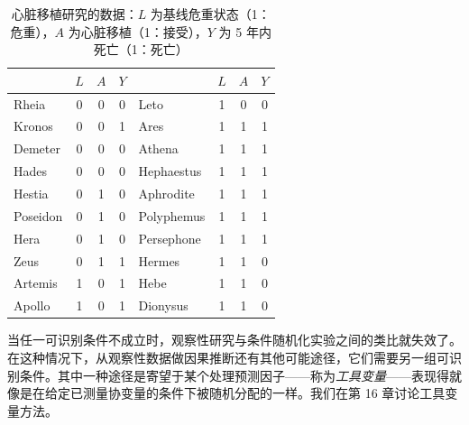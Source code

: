 \begin{table}[htbp]
\centering
\caption{心脏移植研究的数据：$L$ 为基线危重状态（1：危重），$A$ 为心脏移植（1：接受），$Y$ 为 5 年内死亡（1：死亡）}
\label{tab:3.1}
\small
\begin{tabular}{lccc@{\hspace{2.5em}}lccc}
\toprule
& $L$ & $A$ & $Y$ & & $L$ & $A$ & $Y$\\
\midrule
Rheia      & 0 & 0 & 0 & Leto       & 1 & 0 & 0\\
Kronos     & 0 & 0 & 1 & Ares       & 1 & 1 & 1\\
Demeter    & 0 & 0 & 0 & Athena     & 1 & 1 & 1\\
Hades      & 0 & 0 & 0 & Hephaestus & 1 & 1 & 1\\
Hestia     & 0 & 1 & 0 & Aphrodite  & 1 & 1 & 1\\
Poseidon   & 0 & 1 & 0 & Polyphemus & 1 & 1 & 1\\
Hera       & 0 & 1 & 0 & Persephone & 1 & 1 & 1\\
Zeus       & 0 & 1 & 1 & Hermes     & 1 & 1 & 0\\
Artemis    & 1 & 0 & 1 & Hebe       & 1 & 1 & 0\\
Apollo     & 1 & 0 & 1 & Dionysus   & 1 & 1 & 0\\
\bottomrule
\end{tabular}
\end{table}

当任一可识别条件不成立时，观察性研究与条件随机化实验之间的类比就失效了。在这种情况下，从观察性数据做因果推断还有其他可能途径，它们需要另一组可识别条件。其中一种途径是寄望于某个处理预测因子——称为\emph{工具变量}——表现得就像是在给定已测量协变量的条件下被随机分配的一样。我们在第 16 章讨论工具变量方法。

